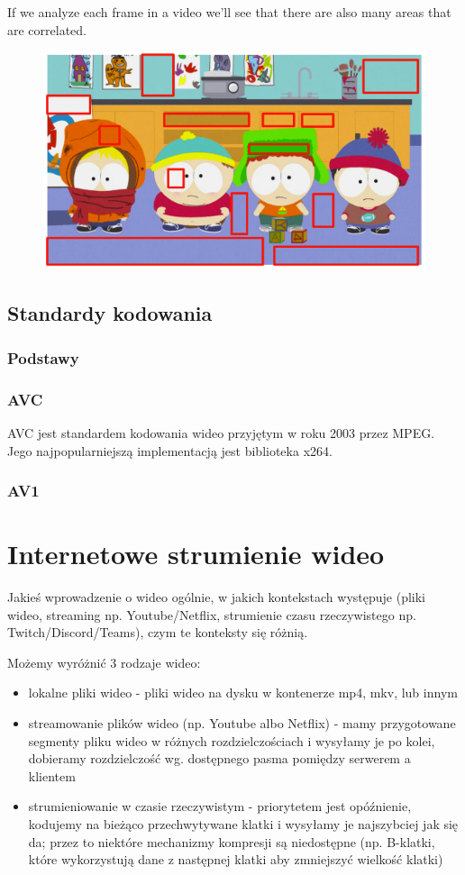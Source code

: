 If we analyze each frame in a video we'll see that there are also many areas that are correlated.

\begin{figure}[H]
	\centering
	\includegraphics[width=.5\textwidth]{img/rozdzial2/repetitions_in_space}
\end{figure}

\subsection{Standardy kodowania}
\subsubsection{Podstawy}
\subsubsection{AVC}

AVC jest standardem kodowania wideo przyjętym w roku 2003 przez MPEG. Jego najpopularniejszą
implementacją jest biblioteka x264.

\subsubsection{AV1}

\section{Internetowe strumienie wideo}

Jakieś wprowadzenie o wideo ogólnie, w jakich kontekstach występuje (pliki wideo, streaming np. Youtube/Netflix,
strumienie czasu rzeczywistego np. Twitch/Discord/Teams), czym te konteksty się różnią.

Możemy wyróżnić 3 rodzaje wideo:

\begin{itemize}
	\item lokalne pliki wideo - pliki wideo na dysku w kontenerze mp4, mkv, lub innym
	\item streamowanie plików wideo (np. Youtube albo Netflix) - mamy przygotowane segmenty pliku
	      wideo w różnych rozdzielczościach i wysyłamy je po kolei, dobieramy rozdzielczość wg.
	      dostępnego pasma pomiędzy serwerem a klientem
	\item strumieniowanie w czasie rzeczywistym - priorytetem jest opóźnienie, kodujemy na bieżąco
	      przechwytywane klatki i wysyłamy je najszybciej jak się da; przez to niektóre mechanizmy
	      kompresji są niedostępne (np. B-klatki, które wykorzystują dane z następnej klatki aby
	      zmniejszyć wielkość klatki)
\end{itemize}

